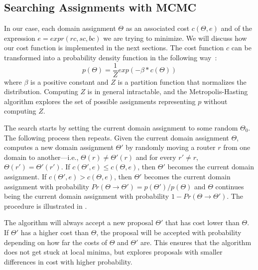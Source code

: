 \subsection{Searching Assignments with MCMC}
In our case, each domain assignment $\Theta$
as an associated cost $c(\Theta, e)$
and of the expression 
$e=expr(rc, sc, bc)$
we are trying to minimize.
We will discuss how our cost function is implemented in the next sections.
The cost function $c$ can be transformed 
into a probability density function in the following way~\cite{mcmcbook}:
\begin{equation}
	p(\Theta) = \frac{1}{Z}exp(-\beta * c(\Theta))
\end{equation}
where $\beta$ is a positive constant and $Z$ is a partition function that
normalizes the distribution. Computing $Z$ is in general 
intractable, and the Metropolis-Hasting algorithm 
explores the set of possible assignments representing $p$ without computing $Z$. 

The search starts by setting the current domain assignment 
to some random $\Theta_0$.
The following process then repeats.
Given the current domain
assignment $\Theta$, 
computes a new domain assignment $\Theta'$ by randomly
moving a router $r$ from one domain to another---i.e., $\Theta(r)\neq \Theta'(r)$ and
for every $r'\neq r$, $\Theta(r')= \Theta'(r')$.
If $c(\Theta',e)\leq c(\Theta,e)$, then $\Theta'$ becomes the current domain assignment.
If $c(\Theta',e)>c(\Theta,e)$, then $\Theta'$ becomes the current domain assignment
with probability $Pr(\Theta \rightarrow \Theta')=p(\Theta')/p(\Theta)$ and 
 $\Theta$ continues being the current domain assignment with probability $1-Pr(\Theta \rightarrow \Theta')$.
\iffull
The procedure is illustrated in .
\fi

The algorithm will always accept a new proposal $\Theta'$
that has cost lower than $\Theta$. If $\Theta'$ has a 
higher cost than $\Theta$, the proposal will be 
accepted with probability depending on 
how far the costs of $\Theta$ and $\Theta'$ are. This ensures that 
the algorithm does not get stuck at local minima, but 
explores proposals with smaller differences in cost with 
higher probability.

